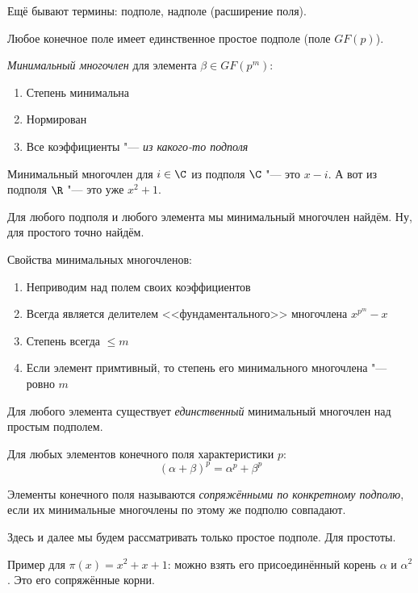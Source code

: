 Ещё бывают термины: подполе, надполе (расширение поля).

\begin{theorem}
Любое конечное поле имеет единственное простое подполе (поле $GF(p)$).
\end{theorem}

\begin{Def}
	\textit{Минимальный многочлен} для элемента $\beta \in GF(p^m)$:
	\begin{enumerate}
	\item Степень минимальна
	\item Нормирован
	\item Все коэффициенты "--- \textit{из какого-то подполя}
	\end{enumerate}
\end{Def}
\begin{exmp}
	Минимальный многочлен для $i \in \C$ из подполя $\C$ "--- это $x-i$.
	А вот из подполя $\R$ "--- это уже $x^2+1$.
\end{exmp}
\begin{theorem}
	Для любого подполя и любого элемента мы минимальный многочлен найдём.
	Ну, для простого точно найдём.
\end{theorem}
\begin{Rem}
	Свойства минимальных многочленов:
	\begin{enumerate}
	\item Неприводим над полем своих коэффициентов
	\setcounter{enumi}{2}
	\item Всегда является делителем <<фундаментального>> многочлена $x^{p^m}-x$
	\item Степень всегда $\le m$
	\item Если элемент примтивный, то степень его минимального многочлена "--- ровно $m$
	\end{enumerate}
\end{Rem}
\begin{theorem}
	Для любого элемента существует \textit{единственный} минимальный многочлен над простым подполем.
\end{theorem}

\begin{lemma}
	Для любых элементов конечного поля характеристики $p$:
	\[ (\alpha + \beta)^p = \alpha^p+\beta^p \]
\end{lemma}
\begin{Def}
	Элементы конечного поля называются \textit{сопряжёнными по конкретному подполю},
	если их минимальные многочлены по этому же подполю совпадают.
\end{Def}
\begin{Rem}
	Здесь и далее мы будем рассматривать только простое подполе.
	Для простоты.
\end{Rem}
\begin{exmp}
	Пример для $\pi(x)=x^2+x+1$: можно взять его
	присоединённый корень $\alpha$ и $\alpha^2$.
	Это его сопряжённые корни.
\end{exmp}

